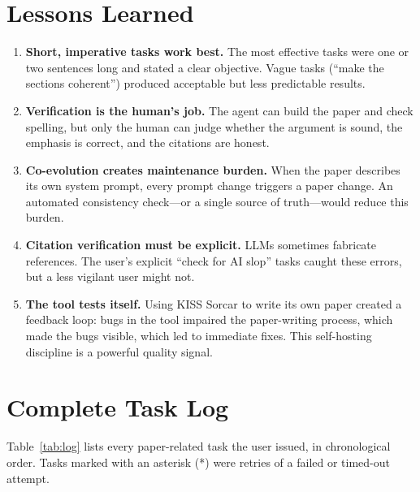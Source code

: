 \documentclass{article}
\begin{document}
\section{Lessons Learned}
\label{sec:lessons}

\begin{enumerate}
  \item \textbf{Short, imperative tasks work best.}  The most effective tasks were one or two sentences long and stated a clear objective.  Vague tasks (``make the sections coherent'') produced acceptable but less predictable results.

  \item \textbf{Verification is the human's job.}  The agent can build the paper and check spelling, but only the human can judge whether the argument is sound, the emphasis is correct, and the citations are honest.

  \item \textbf{Co-evolution creates maintenance burden.}  When the paper describes its own system prompt, every prompt change triggers a paper change.  An automated consistency check---or a single source of truth---would reduce this burden.

  \item \textbf{Citation verification must be explicit.}  LLMs sometimes fabricate references.  The user's explicit ``check for AI slop'' tasks caught these errors, but a less vigilant user might not.

  \item \textbf{The tool tests itself.}  Using KISS Sorcar to write its own paper created a feedback loop: bugs in the tool impaired the paper-writing process, which made the bugs visible, which led to immediate fixes.  This self-hosting discipline is a powerful quality signal.
\end{enumerate}

\section{Complete Task Log}
\label{sec:log}

Table~\ref{tab:log} lists every paper-related task the user issued, in chronological order.  Tasks marked with an asterisk (*) were retries of a failed or timed-out attempt.
\end{document}

